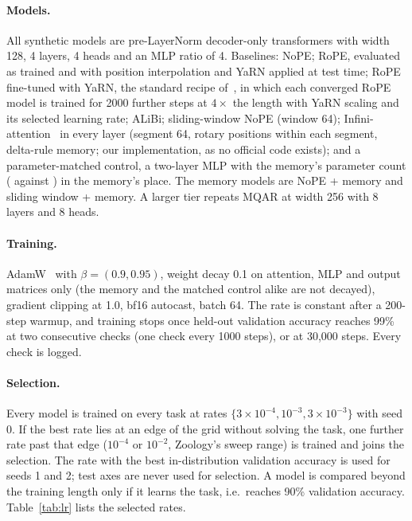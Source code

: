 \documentclass[11pt]{article}
\begin{document}
\paragraph{Models.} All synthetic models are pre-LayerNorm decoder-only transformers
with width 128, 4 layers, 4 heads and an MLP ratio of 4. Baselines: NoPE; RoPE,
evaluated as trained and with position interpolation and YaRN applied at test time;
RoPE fine-tuned with YaRN, the standard recipe of~\citet{peng2024yarn}, in which each
converged RoPE model is trained for 2000 further steps at $4\times$ the length with
YaRN scaling and its selected learning rate; ALiBi; sliding-window NoPE (window 64);
Infini-attention~\citep{munkhdalai2024leave} in every layer (segment 64, rotary positions
within each segment, delta-rule memory; our implementation, as no official code exists); and a parameter-matched
control, a two-layer MLP with the memory's parameter count (\ctrlParams{} against
\memParams) in the memory's place. The memory models are NoPE + memory and sliding
window + memory. A larger tier repeats MQAR at width 256 with 8 layers and 8 heads.

\paragraph{Training.} AdamW~\citep{loshchilov2019decoupled} with
$\beta=(0.9,0.95)$, weight decay 0.1 on attention, MLP and output matrices only (the
memory and the matched control alike are not decayed), gradient clipping at 1.0,
bf16 autocast, batch 64. The rate is constant after a 200-step warmup, and training
stops once held-out validation accuracy reaches 99\% at two consecutive checks (one
check every 1000 steps), or at 30{,}000 steps. Every check is logged.

\paragraph{Selection.} Every model is trained on every task at rates
$\{3\times10^{-4},10^{-3},3\times10^{-3}\}$ with seed 0. If the best rate lies at an
edge of the grid without solving the task, one further rate past that edge
($10^{-4}$ or $10^{-2}$, Zoology's sweep range) is trained and joins the selection.
The rate with the best in-distribution validation accuracy is used for seeds 1 and 2;
test axes are never used for selection. A model is compared beyond the training
length only if it learns the task, i.e.\ reaches 90\% validation accuracy.
Table~\ref{tab:lr} lists the selected rates.
\end{document}
